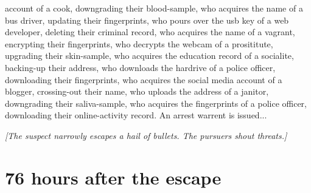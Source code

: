 \documentclass{report}
\begin{document}
account of a cook, downgrading their blood-sample, who acquires the name of a bus driver, updating their fingerprints, who pours over the usb key of a web developer, deleting their criminal record, who acquires the name of a vagrant, encrypting their fingerprints, who decrypts the webcam of a prosititute, upgrading their skin-sample, who acquires the education record of a socialite, backing-up their address, who downloads the hardrive of a police officer, downloading their fingerprints, who acquires the social media account of a blogger, crossing-out their name, who uploads the address of a janitor, downgrading their saliva-sample, who acquires the fingerprints of a police officer, downloading their online-activity record. An arrest warrent is issued...

\textit{[The suspect narrowly escapes a hail of bullets. The pursuers shout threats.]}


\section*{76 \small{hours after the escape}}
\end{document}
